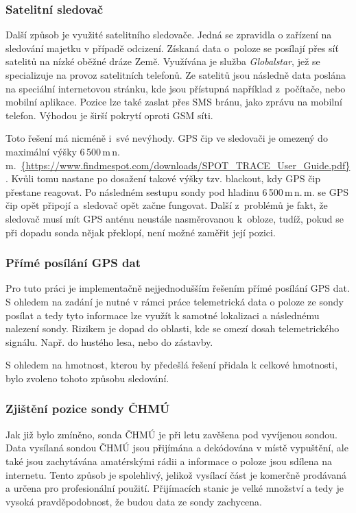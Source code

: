 \documentclass[twoside]{ctuthesis}
\theoremstyle{plain}
\theoremstyle{definition}
\theoremstyle{note}
\begin{document}
			\subsubsection{Satelitní sledovač}
			Další způsob je využité satelitního sledovače. Jedná se zpravidla o zařízení na sledování majetku v případě odcizení. Získaná data o~poloze se posílají přes síť satelitů na nízké oběžné dráze Země. Využívána je služba \textit{Globalstar}, jež se specializuje na provoz satelitních telefonů. Ze satelitů jsou následně data poslána na speciální internetovou stránku, kde jsou přístupná například z~počítače, nebo mobilní aplikace. Pozice lze také zaslat přes SMS bránu, jako zprávu na mobilní telefon. Výhodou je širší pokrytí oproti GSM síti. 

			Toto řešení má nicméně i~své nevýhody. GPS čip ve sledovači je omezený do maximální výšky 6\,500\,m\,n.\,m.~\url{{https://www.findmespot.com/downloads/SPOT_TRACE_User_Guide.pdf}}. Kvůli tomu nastane po dosažení takové výšky tzv. blackout, kdy GPS čip přestane reagovat. Po následném sestupu sondy pod hladinu 6\,500\,m\,n.\,m. se GPS čip opět připojí a~sledovač opět začne fungovat. Další z~problémů je fakt, že sledovač musí mít GPS anténu neustále nasměrovanou k~obloze, tudíž, pokud se při dopadu sonda nějak překlopí, není možné zaměřit její pozici.

			\subsubsection{Přímé posílání GPS dat}
			Pro tuto práci je implementačně nejjednodušším řešením přímé posílání GPS dat. S ohledem na zadání je nutné v rámci práce telemetrická data o poloze ze sondy posílat a tedy tyto informace lze využít k samotné lokalizaci a následnému nalezení sondy. Rizikem je dopad do oblasti, kde se omezí dosah telemetrického signálu. Např. do hustého lesa, nebo do zástavby.

			S ohledem na hmotnost, kterou by předešlá řešení přidala k celkové hmotnosti, bylo zvoleno tohoto způsobu sledování.

			\subsubsection{Zjištění pozice sondy ČHMÚ}
			Jak již bylo zmíněno, sonda ČHMÚ je při letu zavěšena pod vyvíjenou sondou. Data vysílaná sondou ČHMÚ jsou přijímána a dekódována v místě vypuštění, ale také jsou zachytávána amatérskými rádii a informace o poloze jsou sdílena na internetu. Tento způsob je spolehlivý, jelikož vysílací část je komerčně prodávaná a určena pro profesionální použití. Přijímacích stanic je velké množství a tedy je vysoká pravděpodobnost, že budou data ze sondy zachycena. 
\end{document}
